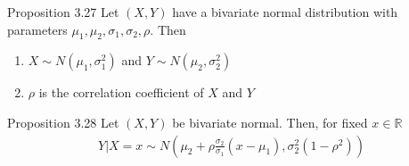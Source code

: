 %
\begin{boks}{Proposition 3.27}
  Let $(X,Y)$ have a bivariate normal distribution with parameters $\mu_1, \mu_2, \sigma_1, \sigma_2, \rho$. Then
  \begin{enumerate}
    \item $X \sim N(\mu_1, \sigma_1^2)$ and $Y \sim N(\mu_2, \sigma_2^2)$
    \item $\rho$ is the correlation coefficient of $X$ and $Y$
  \end{enumerate}
\end{boks}
\begin{boks}{Proposition 3.28}
  Let $(X, Y)$ be bivariate normal. Then, for fixed $x \in \mathbb{R}$
  \begin{align*}
    Y|X = x \sim N \left( \mu_2 + \rho\frac{\sigma_2}{\sigma_1}(x - \mu_1)
    , \sigma_2^2(1 - \rho^2) \right)
  \end{align*}
\end{boks}
%
